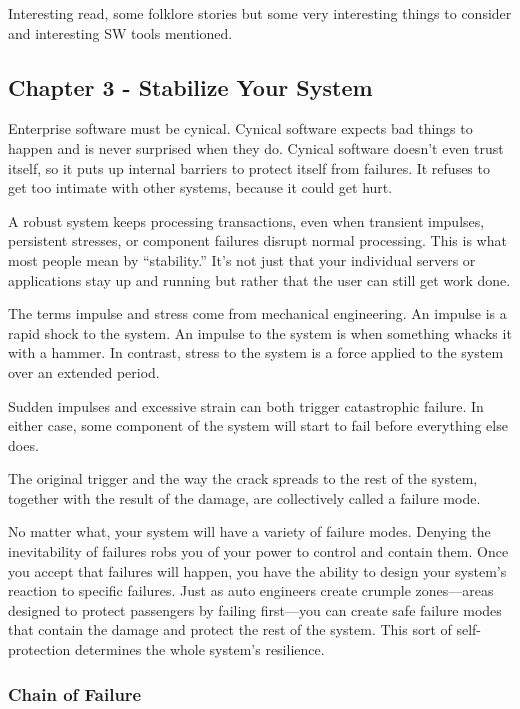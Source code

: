 
Interesting read, some folklore stories but some very interesting things to consider and interesting SW tools mentioned.

\subsection{Chapter 3 - Stabilize Your System}

Enterprise software must be cynical. Cynical software expects bad things to happen and is never surprised when they do. Cynical software doesn’t even trust itself, so it puts up internal barriers to protect itself from failures. It refuses to get too intimate with other systems, because it could get hurt.

A robust system keeps processing transactions, even when transient impulses, persistent stresses, or component failures disrupt normal processing. This is what most people mean by “stability.” It’s not just that your individual servers or applications stay up and running but rather that the user can still get work done.

The terms impulse and stress come from mechanical engineering. An impulse is a rapid shock to the system. An impulse to the system is when something whacks it with a hammer. In contrast, stress to the system is a force applied to the system over an extended period.

Sudden impulses and excessive strain can both trigger catastrophic failure. In either case, some component of the system will start to fail before everything else does.

The original trigger and the way the crack spreads to the rest of the system, together with the result of the damage, are collectively called a failure mode.

No matter what, your system will have a variety of failure modes. Denying the inevitability of failures robs you of your power to control and contain them. Once you accept that failures will happen, you have the ability to design your system’s reaction to specific failures. Just as auto engineers create crumple zones—areas designed to protect passengers by failing first—you can create safe failure modes that contain the damage and protect the rest of the system. This sort of self-protection determines the whole system’s resilience.

\subsubsection{Chain of Failure}


